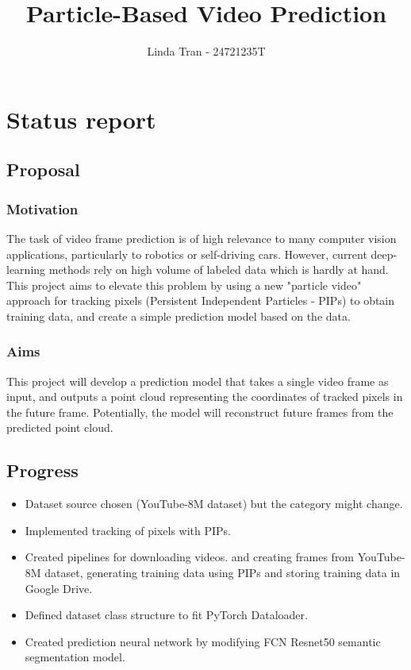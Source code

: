 \documentclass[11pt]{article}
\title{Particle-Based Video Prediction}
\author{Linda Tran - 24721235T }
\begin{document}
    \maketitle
 

\section{Status report}

\subsection{Proposal}\label{proposal}

\subsubsection{Motivation}\label{motivation}
The task of video frame prediction is of high relevance to many computer vision applications, particularly to robotics or self-driving cars. However, current deep-learning methods rely on high volume of labeled data which is hardly at hand. This project aims to elevate this problem by using a new "particle video" approach for tracking pixels (Persistent Independent Particles - PIPs) to obtain training data, and create a simple prediction model based on the data.

\subsubsection{Aims}\label{aims}
This project will develop a prediction model that takes a single video frame as input, and outputs a point cloud representing the coordinates of tracked pixels in the future frame. Potentially, the model will reconstruct future frames from the predicted point cloud.

\subsection{Progress}\label{progress}
\begin{itemize}
\itemsep0em
    \item Dataset source chosen (YouTube-8M dataset) but the category might change.
    \item Implemented tracking of pixels with PIPs.
    \item Created pipelines for downloading videos.
    and creating frames from YouTube-8M dataset, generating training data using PIPs and storing training data in Google Drive.
    \item Defined dataset class structure to fit PyTorch Dataloader.
    \item Created prediction neural network by modifying FCN Resnet50 semantic segmentation model.
\end{itemize}    
\end{document}
